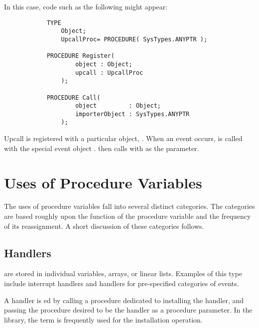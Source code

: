 In this case, code such as the following might appear:
\begin{verbatim}
            TYPE
                Object;
                UpcallProc= PROCEDURE( SysTypes.ANYPTR );

            PROCEDURE Register( 
                    object : Object;
                    upcall : UpcallProc 
                );

            PROCEDURE Call(    
                    object         : Object;
                    importerObject : SysTypes.ANYPTR 
                );
\end{verbatim}

Upcall  is registered with a particular object, .
When an event occurs,  is called with the special event object
.   then calls  with
 as the  parameter.

\section{Uses of Procedure Variables}

The uses of procedure variables fall into several distinct categories.
The categories are based roughly upon the function of the procedure variable 
and the frequency of its reassignment.  A short discussion of these categories 
follows.

\subsection{Handlers}

 are stored in individual variables, arrays, or linear
lists.  Examples of this type include interrupt handlers and handlers for 
pre-specified categories of
events.

A handler is ed by calling a procedure dedicated to
installing the handler, and passing the procedure desired to be the handler as
a procedure parameter.  In the library, the term  is
frequently used for the installation operation.


